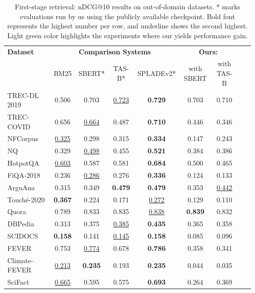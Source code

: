 \documentclass{article}
\begin{document}
\begin{table}[t!] 
    \caption{First-stage retrieval: nDCG@10 results on out-of-domain datasets. * marks evaluations run by us using the publicly available checkpoint. Bold font represents the highest number per row, and underline shows the second highest. Light green color highlights the experiments where our \alg{} yields performance gain.}
    \vspace{5pt}
    \centering \small
    \begin{tabular}{l c c c c c c c c}
        \toprule
        \textbf{Dataset} & \multicolumn{4}{c}{\textbf{Comparison Systems}}  & \multicolumn{2}{c}{\textbf{Ours: \alg{}}} \\
            & BM25 & SBERT* & TAS-B* & SPLADEv2* & with SBERT & with TAS-B   \\ 
        \midrule
TREC-DL 2019 & 0.506 & 0.703 & \underline{0.723} & \textbf{0.729} & 0.703 & 0.710\\
TREC-COVID & 0.656 & \underline{0.664} & 0.487 & \textbf{0.710} & 0.446 & 0.346\\
NFCorpus & \underline{0.325} & 0.298 & 0.315 & \textbf{0.334} & 0.147 & 0.243\\
NQ & 0.329 & \underline{0.498} & 0.455 & \textbf{0.521} & 0.384 & 0.386\\
HotpotQA & \underline{0.603} & 0.587 & 0.581 & \textbf{0.684} & 0.500 & 0.465\\
FiQA-2018 & 0.236 & \underline{0.286} & 0.276 & \textbf{0.336} & 0.124 & 0.133\\
ArguAna & 0.315 & 0.349 & \textbf{0.479} & \textbf{0.479} & \cellcolor{lightgreen}0.353 & \underline{0.442}\\
Touché-2020 & \textbf{0.367} & 0.224 & 0.171 & \underline{0.272} & 0.129 & 0.110\\
Quora & 0.789 & 0.833 & 0.835 & \underline{0.838} & \cellcolor{lightgreen}\textbf{0.839} & 0.832\\
DBPedia & 0.313 & 0.375 & \underline{0.385} & \textbf{0.435} & 0.365 & 0.358\\
SCIDOCS & \textbf{0.158} & 0.141 & \underline{0.145} & \textbf{0.158} & 0.085 & 0.096\\
FEVER & 0.753 & \underline{0.774} & 0.678 & \textbf{0.786} & 0.358 & 0.341\\
Climate-FEVER & \underline{0.213} & \textbf{0.235} & 0.193 & \textbf{0.235} & 0.044 & 0.035\\
SciFact & \underline{0.665} & 0.595 & 0.575 & \textbf{0.693} & 0.264 & 0.369\\
        \bottomrule
    \end{tabular}
    \label{tab:eval_full}
\end{table}



% 
\end{document}
